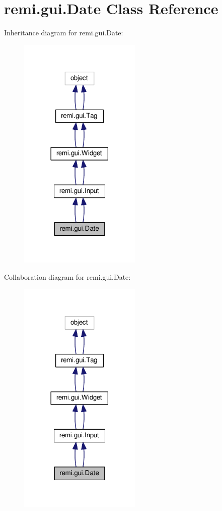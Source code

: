 \hypertarget{classremi_1_1gui_1_1Date}{}\section{remi.\+gui.\+Date Class Reference}
\label{classremi_1_1gui_1_1Date}


Inheritance diagram for remi.\+gui.\+Date\+:
\nopagebreak
\begin{figure}[H]
\begin{center}
\leavevmode
\includegraphics[width=165pt]{da/d08/classremi_1_1gui_1_1Date__inherit__graph}
\end{center}
\end{figure}


Collaboration diagram for remi.\+gui.\+Date\+:
\nopagebreak
\begin{figure}[H]
\begin{center}
\leavevmode
\includegraphics[width=165pt]{df/de4/classremi_1_1gui_1_1Date__coll__graph}
\end{center}
\end{figure}
